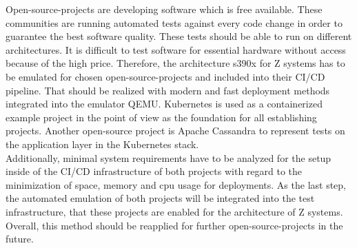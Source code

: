 Open-source-projects are developing software which is free available. These communities are running automated tests against every code change in order to guarantee the best software quality. 
These tests should be able to run on different architectures. It is difficult to test software for essential hardware without access because of the high price. Therefore, the architecture \gls{s390x} for \gls{Z systems} has to be emulated for chosen open-source-projects and included into their \gls{CI/CD} pipeline. That should be realized with modern and fast deployment methods integrated into the \gls{emulator} QEMU. Kubernetes is used as a \gls{containerized} example project in the point of view as the foundation for all establishing projects. Another open-source project is Apache Cassandra to represent tests on the \gls{application layer} in the Kubernetes stack. \\
Additionally, minimal system requirements have to be analyzed for the setup inside of the CI/CD infrastructure of both projects with regard to the minimization of space, memory and cpu usage for deployments. As the last step, the automated emulation of both projects will be integrated into the test infrastructure, that these projects are enabled for the architecture of Z systems. Overall, this method should be reapplied for further open-source-projects in the future.


